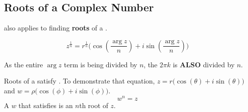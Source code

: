 \subsection{Roots of a Complex Number}\label{subsec:Complex_Roots}
 also applies to finding \textbf{roots} of a .

\begin{equation}\label{eq:Complex_Roots}
  z^{\frac{1}{n}} = r^{\frac{1}{n}} \biggl( \cos \left( \frac{\arg{z}}{n} \right) + i \sin \left( \frac{\arg{z}}{n} \right) \biggr)
\end{equation}

\begin{remark*}
  As the entire $\arg{z}$ term is being divided by $n$, the $2 \pi k$ is \textbf{ALSO} divided by $n$.
\end{remark*}

Roots of a  satisfy .
To demonstrate that equation, $z = r \bigl( \cos(\theta) + i \sin(\theta) \bigr)$ and $w = \rho \bigl( \cos(\phi) + i \sin(\phi) \bigr)$.
\begin{equation}\label{eq:Complex_Root_Requirement}
  w^{n} = z
\end{equation}
A $w$ that satisfies  is an $n$th root of $z$.


